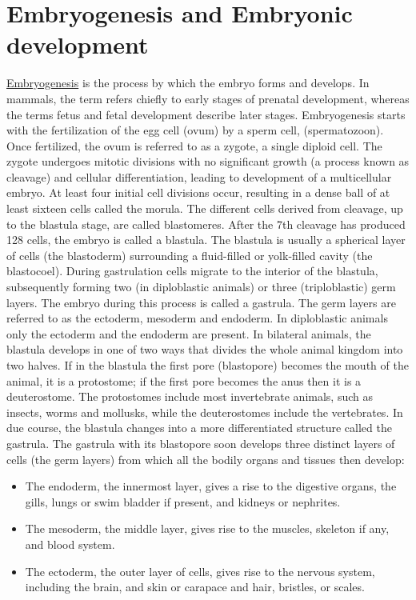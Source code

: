 \section{Embryogenesis and Embryonic
development}\label{embryogenesis-and-embryonic-development}

\href{https://en.wikipedia.org/wiki/Embryogenesis}{Embryogenesis} is the
process by which the embryo forms and develops. In mammals, the term
refers chiefly to early stages of prenatal development, whereas the
terms fetus and fetal development describe later stages. Embryogenesis
starts with the fertilization of the egg cell (ovum) by a sperm cell,
(spermatozoon). Once fertilized, the ovum is referred to as a zygote, a
single diploid cell. The zygote undergoes mitotic divisions with no
significant growth (a process known as cleavage) and cellular
differentiation, leading to development of a multicellular embryo. At
least four initial cell divisions occur, resulting in a dense ball of at
least sixteen cells called the morula. The different cells derived from
cleavage, up to the blastula stage, are called blastomeres. After the
7th cleavage has produced 128 cells, the embryo is called a blastula.
The blastula is usually a spherical layer of cells (the blastoderm)
surrounding a fluid-filled or yolk-filled cavity (the blastocoel).
During gastrulation cells migrate to the interior of the blastula,
subsequently forming two (in diploblastic animals) or three
(triploblastic) germ layers. The embryo during this process is called a
gastrula. The germ layers are referred to as the ectoderm, mesoderm and
endoderm. In diploblastic animals only the ectoderm and the endoderm are
present. In bilateral animals, the blastula develops in one of two ways
that divides the whole animal kingdom into two halves. If in the
blastula the first pore (blastopore) becomes the mouth of the animal, it
is a protostome; if the first pore becomes the anus then it is a
deuterostome. The protostomes include most invertebrate animals, such as
insects, worms and mollusks, while the deuterostomes include the
vertebrates. In due course, the blastula changes into a more
differentiated structure called the gastrula. The gastrula with its
blastopore soon develops three distinct layers of cells (the germ
layers) from which all the bodily organs and tissues then develop:

\begin{itemize}
\tightlist
\item
  The endoderm, the innermost layer, gives a rise to the digestive
  organs, the gills, lungs or swim bladder if present, and kidneys or
  nephrites.
\item
  The mesoderm, the middle layer, gives rise to the muscles, skeleton if
  any, and blood system.
\item
  The ectoderm, the outer layer of cells, gives rise to the nervous
  system, including the brain, and skin or carapace and hair, bristles,
  or scales.
\end{itemize}

